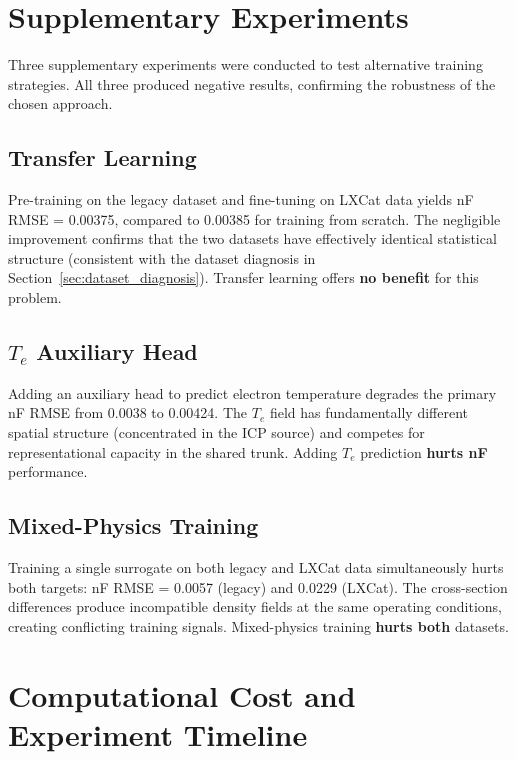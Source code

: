 \documentclass[12pt,a4paper]{article}
\begin{document}
\section{Supplementary Experiments}
\label{sec:supplementary}

Three supplementary experiments were conducted to test alternative
training strategies.  All three produced negative results, confirming
the robustness of the chosen approach.

\subsection{Transfer Learning}

Pre-training on the legacy dataset and fine-tuning on LXCat data
yields nF RMSE = 0.00375, compared to 0.00385 for training from
scratch.  The negligible improvement confirms that the two datasets
have effectively identical statistical structure (consistent with the
dataset diagnosis in Section~\ref{sec:dataset_diagnosis}).  Transfer
learning offers \textbf{no benefit} for this problem.

\subsection{$T_e$ Auxiliary Head}

Adding an auxiliary head to predict electron temperature degrades the
primary nF RMSE from 0.0038 to 0.00424.  The $T_e$ field has
fundamentally different spatial structure (concentrated in the ICP
source) and competes for representational capacity in the shared
trunk.  Adding $T_e$ prediction \textbf{hurts nF} performance.

\subsection{Mixed-Physics Training}

Training a single surrogate on both legacy and LXCat data
simultaneously hurts both targets: nF RMSE = 0.0057 (legacy) and
0.0229 (LXCat).  The cross-section differences produce incompatible
density fields at the same operating conditions, creating conflicting
training signals.  Mixed-physics training \textbf{hurts both}
datasets.

\section{Computational Cost and Experiment Timeline}
\label{sec:compute}
\end{document}
